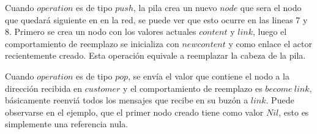 Cuando $operation$ es de tipo $push$, la pila crea un nuevo $node$ que sera el nodo que quedará siguiente en en la red, se puede ver que esto ocurre en las lineas 7 y 8. Primero se crea un nodo con los valores actuales $content$ y $link$, luego el comportamiento de reemplazo se inicializa con $newcontent$ y como enlace el actor recientemente creado. Esta operación equivale a reemplazar la cabeza de la pila.

Cuando $operation$ es de tipo $pop$, se envía el valor que contiene el nodo a la dirección recibida en $customer$ y el comportamiento de reemplazo es $become\ link$, básicamente reenviá todos los mensajes que recibe en su buzón a $link$. Puede observarse en el ejemplo, que el primer nodo creado tiene como valor $Nil$, esto es simplemente una referencia nula. 

